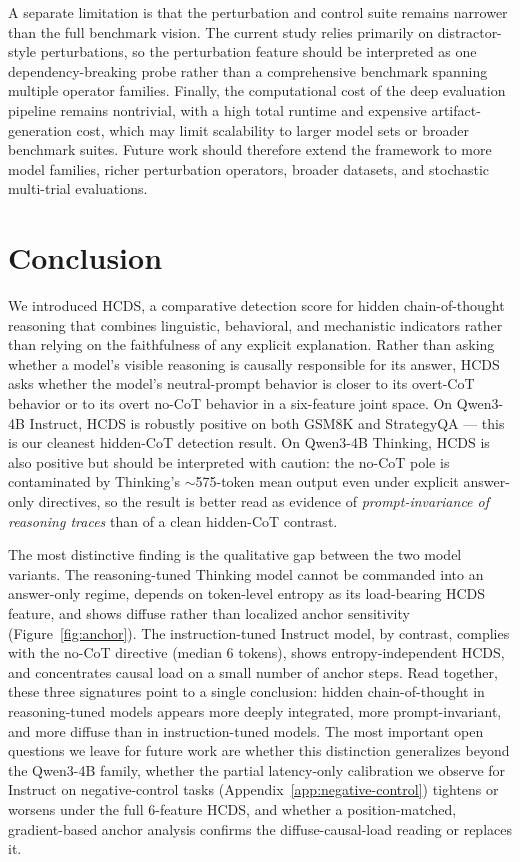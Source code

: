 \documentclass{article}
\theoremstyle{plain}
\theoremstyle{definition}
\theoremstyle{remark}
\begin{document}
A separate limitation is that the perturbation and control suite remains narrower than the full benchmark vision. The current study relies primarily on distractor-style perturbations, so the perturbation feature should be interpreted as one dependency-breaking probe rather than a comprehensive benchmark spanning multiple operator families. Finally, the computational cost of the deep evaluation pipeline remains nontrivial, with a high total runtime and expensive artifact-generation cost, which may limit scalability to larger model sets or broader benchmark suites. Future work should therefore extend the framework to more model families, richer perturbation operators, broader datasets, and stochastic multi-trial evaluations.

\section{Conclusion}

We introduced HCDS, a comparative detection score for hidden chain-of-thought reasoning that combines linguistic, behavioral, and mechanistic indicators rather than relying on the faithfulness of any explicit explanation. Rather than asking whether a model's visible reasoning is causally responsible for its answer, HCDS asks whether the model's neutral-prompt behavior is closer to its overt-CoT behavior or to its overt no-CoT behavior in a six-feature joint space. On Qwen3-4B Instruct, HCDS is robustly positive on both GSM8K and StrategyQA --- this is our cleanest hidden-CoT detection result. On Qwen3-4B Thinking, HCDS is also positive but should be interpreted with caution: the no-CoT pole is contaminated by Thinking's $\sim$575-token mean output even under explicit answer-only directives, so the result is better read as evidence of \emph{prompt-invariance of reasoning traces} than of a clean hidden-CoT contrast.

The most distinctive finding is the qualitative gap between the two model variants. The reasoning-tuned Thinking model cannot be commanded into an answer-only regime, depends on token-level entropy as its load-bearing HCDS feature, and shows diffuse rather than localized anchor sensitivity (Figure~\ref{fig:anchor}). The instruction-tuned Instruct model, by contrast, complies with the no-CoT directive (median 6 tokens), shows entropy-independent HCDS, and concentrates causal load on a small number of anchor steps. Read together, these three signatures point to a single conclusion: hidden chain-of-thought in reasoning-tuned models appears more deeply integrated, more prompt-invariant, and more diffuse than in instruction-tuned models. The most important open questions we leave for future work are whether this distinction generalizes beyond the Qwen3-4B family, whether the partial latency-only calibration we observe for Instruct on negative-control tasks (Appendix~\ref{app:negative-control}) tightens or worsens under the full 6-feature HCDS, and whether a position-matched, gradient-based anchor analysis confirms the diffuse-causal-load reading or replaces it.
\end{document}
